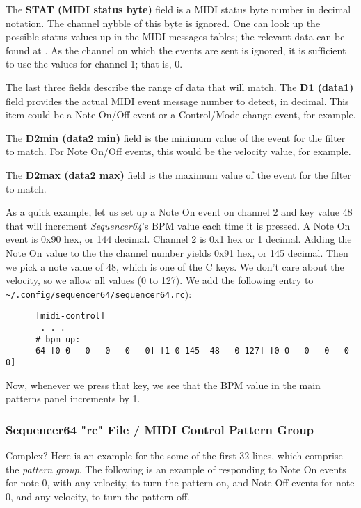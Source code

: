    The \textbf{STAT (MIDI status byte)} field is a MIDI status byte number in
   decimal notation.  The channel nybble of this byte is ignored.  One can look
   up the possible status values up in the MIDI messages tables; the relevant
   data can be found at \cite{midicontroltable}.  As the channel on which the
   events are sent is ignored, it is sufficient to use the values for channel
   1; that is, 0.

   The last three fields describe the range of data that will match.  The
   \textbf{D1 (data1)} field provides the actual MIDI event message number to
   detect, in decimal.  This item could be a Note On/Off event or a
   Control/Mode change event, for example.

   The \textbf{D2min (data2 min)} field is the minimum value of the event for
   the filter to match. For Note On/Off events, this would be the velocity
   value, for example.

   The \textbf{D2max (data2 max)} field is the maximum value of the event for
   the filter to match.

   As a quick example, let us set up a Note On event on channel 2 and key value
   48 that will increment \textsl{Sequencer64}'s BPM value each time it is
   pressed.  A Note On event is 0x90 hex, or 144 decimal.  Channel 2 is 0x1 hex
   or 1 decimal.   Adding the Note On value to the the channel number yields
   0x91 hex, or 145 decimal.  Then we pick a note value of 48, which is one of
   the C keys.  We don't care about the velocity, so we allow all values (0 to
   127).  We add the following entry to
   \texttt{\textasciitilde/.config/sequencer64/sequencer64.rc}):

   \begin{verbatim}
      [midi-control]
       . . .
      # bpm up:
      64 [0 0   0   0   0   0] [1 0 145  48   0 127] [0 0   0   0   0   0]
   \end{verbatim}

   Now, whenever we press that key, we see that the BPM value in the main
   patterns panel increments by 1.

\subsubsection{Sequencer64 "rc" File / MIDI Control Pattern Group}
\label{subsubsec:seq64_rc_file_midi_control_pattern_group}

   Complex?  Here is an example for the some of the first 32 lines, which
   comprise the \textsl{pattern group}.
   The following is an example of responding
   to Note On events for note 0, with any velocity, to turn the pattern on,
   and Note Off events for note 0, and any velocity, to turn the pattern
   off.

